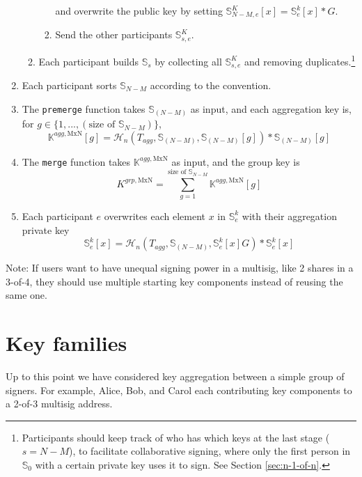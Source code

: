 \begin{enumerate}
\begin{enumerate}
\begin{enumerate}
            and overwrite the public key by setting $\mathbb{S}^K_{N-M,e}[x] = \mathbb{S}^{k}_{e}[x]*G$.
            \item Send the other participants $\mathbb{S}^K_{s,e}$.
        \end{enumerate}
        \item Each participant builds $\mathbb{S}_{s}$ by collecting all $\mathbb{S}^K_{s,e}$ and removing duplicates.\footnote{Participants should keep track of who has which keys at the last stage ($s = N-M$), to facilitate collaborative signing, where only the first person in $\mathbb{S}_0$ with a certain private key uses it to sign. See Section \ref{sec:n-1-of-n}.}
    \end{enumerate}
    \item Each participant sorts $\mathbb{S}_{N-M}$ according to the convention.
    \item The {\tt premerge} function takes $\mathbb{S}_{(N-M)}$ as input, and each aggregation key is, for \(g \in \{1,...,(\textrm{size of }\mathbb{S}_{N-M})\}\),\vspace{.175cm}
    \[\mathbb{K}^{agg,\textrm{MxN}}[g] = \mathcal{H}_n(T_{agg},\mathbb{S}_{(N-M)},\mathbb{S}_{(N-M)}[g])*\mathbb{S}_{(N-M)}[g]\]
    \item The {\tt merge} function takes $\mathbb{K}^{agg,\textrm{MxN}}$ as input, and the group key is\vspace{.175cm}
    \[K^{grp,\textrm{MxN}} = \sum^{\textrm{size of }\mathbb{S}_{N-M}}_{g = 1} \mathbb{K}^{agg,\textrm{MxN}}[g]\]
    \item Each participant $e$ overwrites each element $x$ in $\mathbb{S}^k_{e}$ with their aggregation private key\vspace{.175cm}
    \[ \mathbb{S}^k_{e}[x] = \mathcal{H}_n(T_{agg},\mathbb{S}_{(N-M)},\mathbb{S}^k_{e}[x] G)*\mathbb{S}^k_{e}[x] \]
\end{enumerate}

Note: If users want to have unequal signing power in a multisig, like 2 shares in a 3-of-4, they should use multiple starting key components instead of reusing the same one.



\section{Key families}
\label{sec:general-key-families}

Up to this point we have considered key aggregation between a simple group of signers. For example, Alice, Bob, and Carol each contributing key components to a 2-of-3 multisig address.

